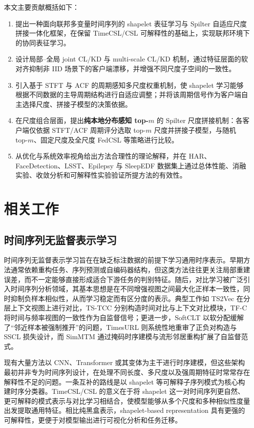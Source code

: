 \documentclass{article}
\begin{document}
本文主要贡献概括如下：
\begin{enumerate}[leftmargin=2.5em]
    \item 提出一种面向联邦多变量时间序列的 shapelet 表征学习与 Spilter 自适应尺度拼接一体化框架，在保留 TimeCSL/CSL 可解释性的基础上，实现联邦环境下的协同表征学习。
    \item 设计局部--全局 joint CL/KD 与 multi-scale CL/KD 机制，通过特征层面的软对齐抑制非 IID 场景下的客户端漂移，并增强不同尺度子空间的一致性。
    \item 引入基于 STFT 与 ACF 的周期感知多尺度权重机制，使 shapelet 学习能够根据不同数据的主导周期结构进行自适应调整；并将该周期信号作为客户端自主选择尺度、拼接子模型的决策依据。
    \item 在尺度组合层面，提出\textbf{纯本地分布感知 top-$m$} 的 Spilter 尺度拼接机制：各客户端仅依据 STFT/ACF 周期评分选取 top-$m$ 尺度并拼接子模型，与随机 top-$m$、固定尺度及全尺度 FedCSL 等策略进行比较。
    \item 从优化与系统效率视角给出方法合理性的理论解释，并在 HAR、FaceDetection、LSST、Epilepsy 与 SleepEDF 数据集上通过总体性能、消融实验、收敛分析和可解释性实验验证所提方法的有效性。
\end{enumerate}

\section{相关工作}

\subsection{时间序列无监督表示学习}

时间序列无监督表示学习旨在在缺乏标注数据的前提下学习通用时序表示。早期方法通常依赖重构任务、序列预测或自编码器结构，但这类方法往往更关注局部重建误差，而不一定能够直接形成适合下游任务的判别特征\cite{simmtm}。随后，对比学习被广泛引入时间序列分析领域，其基本思想是在不同增强视图之间最大化正样本一致性，同时抑制负样本相似性，从而学习稳定而有区分度的表示。典型工作如 TS2Vec 在分层上下文视图上进行对比\cite{ts2vec}，TS-TCC 分别构造时间对比与上下文对比模块\cite{tstcc}，TF-C 将时间与频率视图的一致性作为自监督信号\cite{tfc}；更进一步，SoftCLT 以软分配缓解了“邻近样本被强制推开”的问题\cite{softclt}，TimesURL 则系统性地重审了正负对构造与 SSCL 损失设计\cite{timesurl}，而 SimMTM 通过掩码时序建模与流形邻居重构扩展了自监督范式\cite{simmtm}。

现有大量方法以 CNN、Transformer 或其变体为主干进行时序建模\cite{fcnbaseline,timesnet}，但这些架构最初并非专为时间序列设计，在处理不同长度、多尺度以及强周期特征时常常存在解释性不足的问题。一条互补的路线是以 shapelet 等可解释子序列模式为核心构建时序分类器\cite{interpgn,unishape}。TimeCSL/CSL 的意义在于将 shapelet 这一对时间序列更自然、更可解释的模式表示与对比学习相结合，使模型能够从多个尺度和多种相似性度量出发提取通用特征\cite{timescsl}。相比纯黑盒表示，shapelet-based representation 具有更强的可解释性，更便于对模型输出进行可视化分析和任务迁移\cite{interpgn}。
\end{document}
